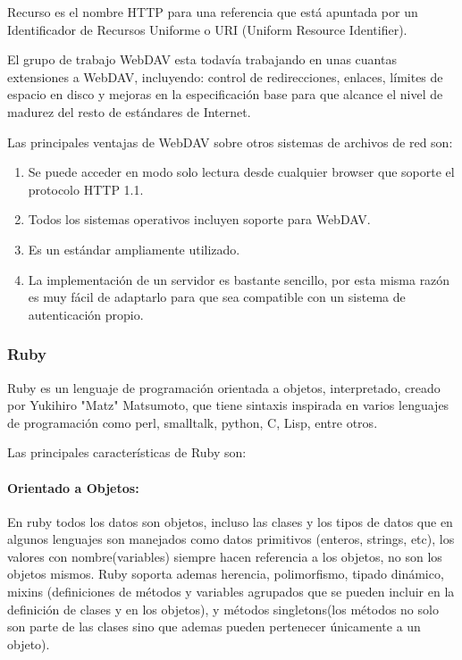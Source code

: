 Recurso es el nombre HTTP para una referencia que está apuntada por un Identificador de Recursos Uniforme o URI (Uniform Resource Identifier).

El grupo de trabajo WebDAV esta todavía trabajando en unas cuantas extensiones a WebDAV, incluyendo: control de redirecciones, enlaces, límites de espacio en disco y mejoras en la especificación base para que alcance el nivel de madurez del resto de estándares de Internet.

Las principales ventajas de WebDAV sobre otros sistemas de archivos de red son:

\begin{enumerate}

	\item Se puede acceder en modo solo lectura desde cualquier browser que soporte el protocolo HTTP 1.1.
	
	\item Todos los sistemas operativos incluyen soporte para WebDAV.
	
	\item Es un estándar ampliamente utilizado.
	
	\item La implementación de un servidor es bastante sencillo, por esta misma razón es muy fácil de adaptarlo para que sea compatible con un sistema de autenticación propio.

\end{enumerate}


\subsubsection*{Ruby \cite{ruby_lang} }

Ruby es un lenguaje de programación orientada a objetos, interpretado, creado por Yukihiro "Matz" Matsumoto, que tiene sintaxis inspirada en varios lenguajes de programación como perl, smalltalk, python, C, Lisp, entre otros.

Las principales características de Ruby son:

\paragraph{Orientado a Objetos:}
En ruby todos los datos son objetos, incluso las clases y los tipos de datos que en algunos lenguajes son manejados como datos primitivos (enteros, strings, etc), los valores con nombre(variables) siempre hacen referencia a los objetos, no son los objetos mismos. \newline Ruby soporta ademas herencia, polimorfismo, tipado dinámico, mixins (definiciones de métodos y variables agrupados que se pueden incluir en la definición de clases y en los objetos), y métodos singletons(los métodos no solo son parte de las clases sino que ademas pueden pertenecer únicamente a un objeto).

